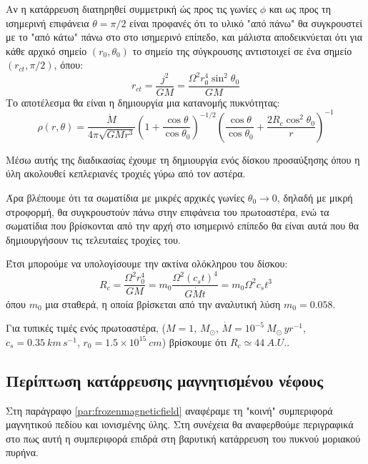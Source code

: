 \documentclass[a4paper,12pt]{memoir}
\newcommand{\e}[1]{\times 10^{#1}}
\begin{document}
Αν η κατάρρευση διατηρηθεί συμμετρική ώς προς τις γωνίες $\phi$  και ως προς τη ισημερινή επιφάνεια $\theta = \pi/2$ είναι προφανές ότι το υλικό "από πάνω" θα συγκρουστεί με το "από κάτω" πάνω στο στο ισημερινό επίπεδο, και μάλιστα αποδεικνύεται ότι για κάθε αρχικό σημείο $(r_0,\theta _0)$ το σημείο της σύγκρουσης αντιστοιχεί σε ένα σημείο $(r_{ct},\pi/2)$, όπου:
\begin{equation}
r_{ct}=\frac{j^2}{GM}=\frac{\Omega^2 r_0 ^4 \sin ^2 \theta_0}{GM}
\end{equation}
Το αποτέλεσμα θα είναι η δημιουργία μια κατανομής πυκνότητας:
\begin{equation}
\rho (r,\theta) =\frac{\dot{M}}{4 \pi \sqrt{G M r^3}}\left(1+\frac{\cos \theta}{\cos \theta _0}\right)^{-1/2} \left( \frac{\cos \theta}{\cos \theta _0} + \frac{2 R_c \cos^2 \theta _0}{r} \right) ^{-1} 
\end{equation}

Μέσω αυτής της διαδικασίας έχουμε τη δημιουργία ενός δίσκου προσαύξησης όπου η ύλη ακολουθεί κεπλεριανές τροχιές γύρω από τον αστέρα.

Άρα βλέπουμε ότι τα σωματίδια με μικρές αρχικές γωνίες $\theta _0 \to 0$, δηλαδή με μικρή στροφορμή, θα συγκρουστούν πάνω στην επιφάνεια του πρωτοαστέρα, ενώ τα σωματίδια που βρίσκονται από την αρχή στο ισημερινό επίπεδο θα είναι αυτά που θα δημιουργήσουν τις τελευταίες τροχίες του. 

Έτσι μπορούμε να υπολογίσουμε την ακτίνα ολόκληρου του δίσκου:
\begin{equation}
R_c=\frac{\Omega^2 r_0 ^4}{GM} = m_0 \frac{\Omega^2 (c_s t)^4}{G \dot{M} t} =m_0 \Omega ^2 c_s t^3
\end{equation}
όπου $m_0$ μια σταθερά, η οποία βρίσκεται από την αναλυτική λύση $m_0=0.058$. 

Για τυπικές τιμές ενός πρωτοαστέρα, ($M=1$, $M_{\odot}$, $\dot{M}=10^{-5} \ M_{\odot} \, yr^{-1}$, $c_s =0.35\ km\, s^{-1}$, $r_0 = 1.5 \e{15}\ cm$) βρίσκουμε ότι $R_c \simeq 44\ A.U.$.  

\subsection{Περίπτωση κατάρρευσης μαγνητισμένου νέφους}
Στη παράγραφο \ref{par:frozenmagneticfield} αναφέραμε τη "κοινή" συμπεριφορά μαγνητικού πεδίου και ιονισμένης ύλης. Στη συνέχεια θα αναφερθούμε περιγραφικά στο πως αυτή η συμπεριφορά επιδρά στη βαρυτική κατάρρευση του πυκνού μοριακού πυρήνα.
\end{document}

